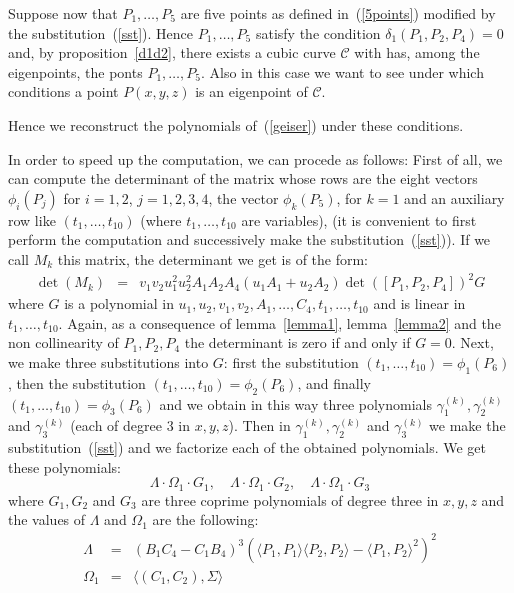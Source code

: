 \documentclass{amsart}
\theoremstyle{plain}
\theoremstyle{definition}
\newcommand{\scl}[2]{\langle #1, #2 \rangle}
\begin{document}
Suppose now that $P_1, \dots, P_5$ are five points as defined
in~(\ref{5points}) modified by the substitution~(\ref{sst}). Hence
$P_1, \dots, P_5$ satisfy the condition $\delta_1(P_1, P_2, P_4)=0$
and, by proposition~\ref{d1d2}, there exists a cubic curve $\mathcal{C}$
with has, among the eigenpoints,  the ponts $P_1, \dots, P_5$. 
Also in this case we want to see under which conditions a
point $P(x, y, z)$ is an eigenpoint of $\mathcal{C}$.

Hence we reconstruct the polynomials of~(\ref{geiser}) under these conditions.

In order to speed up the computation, we can procede as follows:
First of all, we can compute the determinant of the matrix whose rows
are the eight vectors $\phi_i(P_j)$ for $i=1, 2$, $j = 1, 2, 3, 4$,
the vector $\phi_k(P_5)$, for $k=1$
and an auxiliary row like $(t_1, \dots, t_{10})$ (where $t_1, \dots, t_{10}$
are variables), (it is convenient to first perform the computation and
successively make the substitution~(\ref{sst})). If we call $M_k$
this matrix, the determinant we get is 
of the form:
\begin{eqnarray}
  \det(M_k) & = &
  v_1 v_2 u_1^2 u_2^2 A_1A_2A_4 (u_1A_1 + u_2A_2) \det([P_1, P_2, P_4])^2 G
  \label{detMk}
\end{eqnarray}
where $G$ is a polynomial in $u_1, u_2, v_1, v_2, A_1, \dots, C_4, t_1,
\dots, t_{10}$ and is
linear in $t_1, \dots, t_{10}$.
Again, as a consequence of 
lemma~\ref{lemma1}, lemma~\ref{lemma2} and the non collinearity of $P_1,
P_2, P_4$ the determinant is zero if and only
if $G=0$. Next, we make three substitutions into
$G$: first the substitution
$(t_1, \dots, t_{10})  = \phi_1(P_6)$, then the substitution
$(t_1, \dots, t_{10})  = \phi_2(P_6)$, and finally
$(t_1, \dots, t_{10})  = \phi_3(P_6)$ and we obtain in this way
three polynomials $\gamma_1^{(k)}, \gamma_2^{(k)}$ and $\gamma_3^{(k)}$
(each of degree $3$ in $x, y, z$). Then in $\gamma_1^{(k)},
\gamma_2^{(k)}$ and $\gamma_3^{(k)}$
we make the substitution~(\ref{sst}) and we factorize each of the
obtained polynomials. We get these polynomials:
\[
\Lambda \cdot \Omega_1 \cdot G_1, \quad \Lambda \cdot \Omega_1
\cdot G_2, \quad
\Lambda \cdot \Omega_1 \cdot G_3
\]
where $G_1, G_2$ and $G_3$ are three coprime polynomials of degree three
in $x, y, z$ and the values of $\Lambda$ and $\Omega_1$ are the following:
\begin{eqnarray}
  \Lambda\phantom{{}_1} &=& (B_1C_4-C_1B_4)^3 
  \left( \scl{P_1}{P_1}\scl{P_2}{P_2}-\scl{P_1}{P_2}^2\right)^2\\
\Omega_1 &=& \scl{(C_1, C_2)}{\Sigma}
\end{eqnarray}
\end{document}
